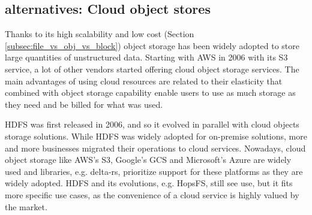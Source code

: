 \subsection{ alternatives: Cloud object stores}

Thanks to its high scalability and low cost (Section \ref{subsec:file_vs_obj_vs_block}) object storage has been widely adopted to store large quantities of unstructured data. Starting with \gls{AWS} in 2006 with its S3 service, a lot of other vendors started offering cloud object storage services. The main advantages of using cloud resources are related to their elasticity that combined with object storage capability enable users to use as much storage as they need and be billed for what was used. 

\gls{HDFS} was first released in 2006, and so it evolved in parallel with cloud objects storage solutions. While \gls{HDFS} was widely adopted for on-premise solutions, more and more businesses migrated their operations to cloud services. Nowadays, cloud object storage like \gls{AWS}'s S3, Google's \gls{GCS} and Microsoft's Azure are widely used and libraries, e.g. delta-rs, prioritize support for these platforms as they are widely adopted. \gls{HDFS} and its evolutions, e.g. \gls{HopsFS}, still see use, but it fits more specific use cases, as the convenience of a cloud service is highly valued by the market.